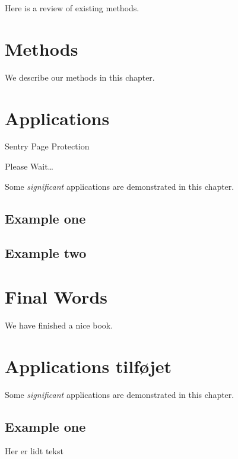 \documentclass[]{book}
\theoremstyle{definition}
\theoremstyle{definition}
\theoremstyle{definition}
\theoremstyle{remark}
\begin{document}
Here is a review of existing methods.

\hypertarget{methods}{%
\chapter{Methods}\label{methods}}

We describe our methods in this chapter.

\hypertarget{applications}{%
\chapter{Applications}\label{applications}}

\hypertarget{Sentry_noJS}{}
Sentry Page Protection

\hypertarget{Sentry_redirecting}{}
Please Wait\ldots{}

Some \emph{significant} applications are demonstrated in this chapter.

\hypertarget{example-one}{%
\section{Example one}\label{example-one}}

\hypertarget{example-two}{%
\section{Example two}\label{example-two}}

\hypertarget{final-words}{%
\chapter{Final Words}\label{final-words}}

We have finished a nice book.

\hypertarget{applications-tilfjet}{%
\chapter{Applications tilføjet}\label{applications-tilfjet}}

Some \emph{significant} applications are demonstrated in this chapter.

\hypertarget{example-one-1}{%
\section{Example one}\label{example-one-1}}

Her er lidt tekst
\end{document}
